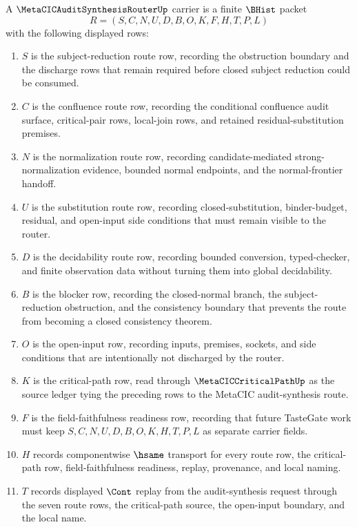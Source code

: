 \begin{definition}
\label{def:metacic-audit-synthesis-router-carrier}
A $\MetaCICAuditSynthesisRouterUp$ carrier is a finite $\BHist$ packet
$$
R=(S,C,N,U,D,B,O,K,F,H,T,P,L)
$$
with the following displayed rows:
\begin{enumerate}
\item $S$ is the subject-reduction route row, recording the obstruction boundary and the discharge rows that remain required before closed subject reduction could be consumed.
\item $C$ is the confluence route row, recording the conditional confluence audit surface, critical-pair rows, local-join rows, and retained residual-substitution premises.
\item $N$ is the normalization route row, recording candidate-mediated strong-normalization evidence, bounded normal endpoints, and the normal-frontier handoff.
\item $U$ is the substitution route row, recording closed-substitution, binder-budget, residual, and open-input side conditions that must remain visible to the router.
\item $D$ is the decidability route row, recording bounded conversion, typed-checker, and finite observation data without turning them into global decidability.
\item $B$ is the blocker row, recording the closed-normal branch, the subject-reduction obstruction, and the consistency boundary that prevents the route from becoming a closed consistency theorem.
\item $O$ is the open-input row, recording inputs, premises, sockets, and side conditions that are intentionally not discharged by the router.
\item $K$ is the critical-path row, read through $\MetaCICCriticalPathUp$ as the source ledger tying the preceding rows to the MetaCIC audit-synthesis route.
\item $F$ is the field-faithfulness readiness row, recording that future TasteGate work must keep $S,C,N,U,D,B,O,K,H,T,P,L$ as separate carrier fields.
\item $H$ records componentwise $\hsame$ transport for every route row, the critical-path row, field-faithfulness readiness, replay, provenance, and local naming.
\item $T$ records displayed $\Cont$ replay from the audit-synthesis request through the seven route rows, the critical-path source, the open-input boundary, and the local name.

\end{enumerate}
\end{definition}
